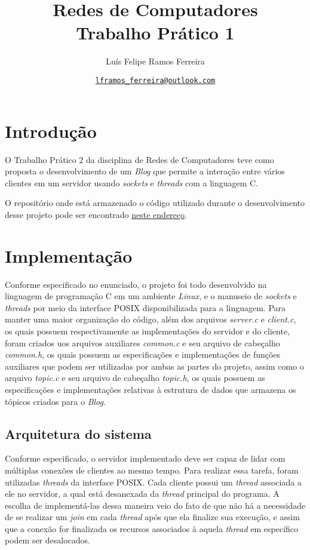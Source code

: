 \documentclass{article}
\title{Redes de Computadores \\ \large Trabalho Prático 1}
\author{Luís Felipe Ramos Ferreira}
\date{\href{mailto:lframos\_ferreira@outlook.com}{\texttt{lframos\_ferreira@outlook.com}}
}
\begin{document}
\maketitle

\section{Introdução}

O Trabalho Prático 2 da disciplina de Redes de Computadores teve como proposta
o desenvolvimento de um \textit{Blog} que permite a interação entre vários
clientes em um servidor usando \textit{sockets} e \textit{threads} com a
linguagem C.

O repositório onde está armazenado o código utilizado durante o desenvolvimento
desse projeto
pode ser encontrado \href{https://github.com/lframosferreira/tp2-redes}{neste
      endereço}.

\section{Implementação}

Conforme especificado no enunciado, o projeto foi todo desenvolvido na
linguagem de programação C em um ambiente \textit{Linux}, e o manuseio de
\textit{sockets} e \textit{threads} por
meio da interface POSIX
disponibilizada para a linguagem. Para manter uma maior organização do código,
além dos arquivos \textit{server.c} e \textit{client.c}, os quais possuem
respectivamente as implementações do servidor e do cliente,
foram criados uos arquivos auxiliares \textit{common.c} e seu arquivo de
cabeçalho
\textit{common.h}, os quais possuem as especificações e implementações de
funções auxiliares que podem ser utilizadas por ambas as partes do projeto,
assim como o arquivo \textit{topic.c} e seu arquivo de cabeçalho
\textit{topic.h},
os quais possuem as especificações e implementações relativas à estrutura de
dados que armazena os tópicos criados para o \textit{Blog}.

\subsection{Arquitetura do sistema}

Conforme especificado, o servidor implementado deve ser capaz de lidar com
múltiplas conexões de clientes ao mesmo tempo. Para realizar essa tarefa,
foram utilizadas \textit{threads} da interface POSIX. Cada cliente possui um
\textit{thread} associada a ele no servidor, a qual está desanexada da
\textit{thread}
principal do programa. A escolha de implementá-las dessa maneira veio do fato
de que não há a necessidade de se realizar um \textit{join} em cada
\textit{thread} após que ela finalize sua execução, e assim
que a conexão for finalizada os recursos associados à aquela \textit{thread} em
específico podem ser desalocados.
\end{document}
